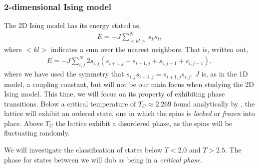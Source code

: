 \subsubsection{2-dimensional Ising model} \label{sec:2d-ising-model}
The 2D Ising model has its energy stated as,
\begin{align}
    E = - J\sum^N_{<kl>} s_k s_l,
    \label{eq:2d-ising-energy}
\end{align}
where $<kl>$ indicates a sum over the nearest neighbors. That is, written out,
\begin{align}
    E = - J\sum^N_{i,j} 2 s_{i,j} (s_{i+1,j} + s_{i-1,j} + s_{i,j+1} + s_{i,j-1}),
    \label{eq:2d-ising-energy-shortened}
\end{align}
where we have used the symmetry that $s_{i,j} s_{i+1,j}=s_{i+1,j} s_{i,j}$. $J$ is, as in the 1D model, a coupling constant, but will not be our main focus when studying the 2D Ising model. This time, we will focus on its property of exhibiting phase transitions. Below a critical temperature of $T_C \approx 2.269$ found analytically by \citep{onsager1944crystal}, the lattice will exhibit an ordered state, one in which the spins is \textit{locked} or \textit{frozen} into place. Above $T_C$ the lattice exhibit a disordered phase, as the spins will be fluctuating randomly.

We will investigate the classification of states below $T<2.0$ and $T>2.5$. The phase for states between we will dub as being in a \textit{critical phase}.